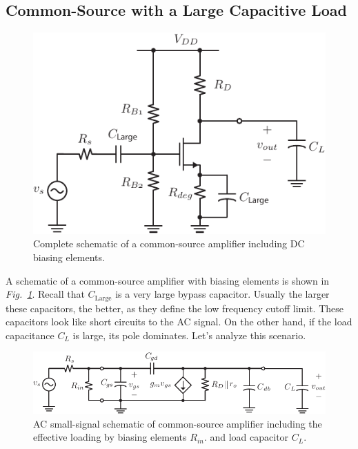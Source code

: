 \subsection{Common-Source with a Large Capacitive Load}
\begin{figure}[tb]
\centering
\includegraphics[scale=1]{6cs_dc}
\caption{Complete schematic of a common-source amplifier including DC biasing elements.}
\label{fig:6cs_dc}
\end{figure}
A schematic of a common-source amplifier with biasing elements is shown in \emph{Fig.~\ref{fig:6cs_dc}}. Recall that $C_{\text{Large}}$ is a very large bypass capacitor.  Usually the larger these capacitors, the better, as they define the low frequency cutoff limit.  These capacitors look like short circuits to the AC signal.  On the other hand, if the load capacitance $C_L$ is large, its pole dominates. Let's analyze this scenario.
\begin{figure}[tb]
\centering
\includegraphics[scale=1]{7cs_cL_ss}
\caption{AC small-signal schematic of common-source amplifier including the effective loading by biasing elements $R_{in}$. and load capacitor $C_L$.}
\label{fig:7cs_cL_ss}
\end{figure}
